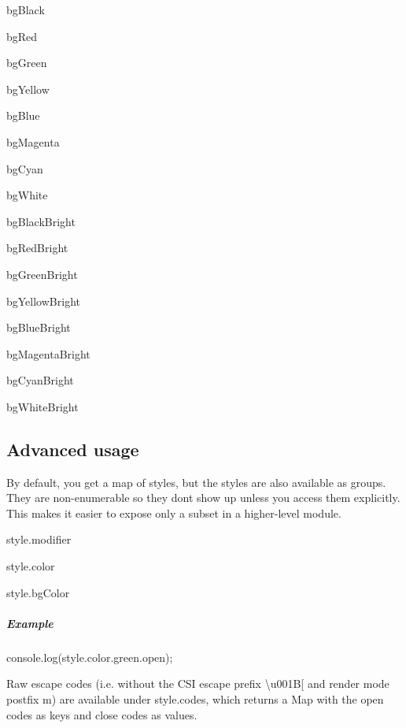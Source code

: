 \begin{DoxyItemize}
\item {\ttfamily bg\+Black}
\item {\ttfamily bg\+Red}
\item {\ttfamily bg\+Green}
\item {\ttfamily bg\+Yellow}
\item {\ttfamily bg\+Blue}
\item {\ttfamily bg\+Magenta}
\item {\ttfamily bg\+Cyan}
\item {\ttfamily bg\+White}
\item {\ttfamily bg\+Black\+Bright}
\item {\ttfamily bg\+Red\+Bright}
\item {\ttfamily bg\+Green\+Bright}
\item {\ttfamily bg\+Yellow\+Bright}
\item {\ttfamily bg\+Blue\+Bright}
\item {\ttfamily bg\+Magenta\+Bright}
\item {\ttfamily bg\+Cyan\+Bright}
\item {\ttfamily bg\+White\+Bright}
\end{DoxyItemize}

\subsection*{Advanced usage}

By default, you get a map of styles, but the styles are also available as groups. They are non-\/enumerable so they don\textquotesingle{}t show up unless you access them explicitly. This makes it easier to expose only a subset in a higher-\/level module.


\begin{DoxyItemize}
\item {\ttfamily style.\+modifier}
\item {\ttfamily style.\+color}
\item {\ttfamily style.\+bg\+Color}
\end{DoxyItemize}

\subparagraph*{Example}


\begin{DoxyCode}
console.log(style.color.green.open);
\end{DoxyCode}


Raw escape codes (i.\+e. without the C\+SI escape prefix {\ttfamily \textbackslash{}u001B\mbox{[}} and render mode postfix {\ttfamily m}) are available under {\ttfamily style.\+codes}, which returns a {\ttfamily Map} with the open codes as keys and close codes as values.

